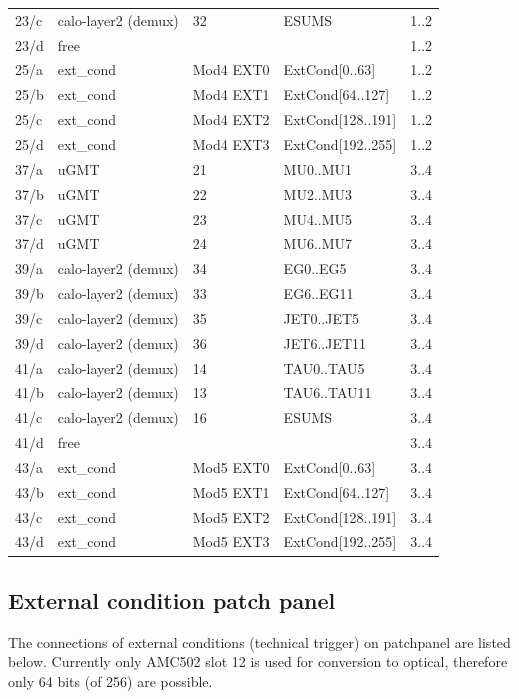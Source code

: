 \begin{longtable}{|l|l|l|l|c|}
23/c & calo-layer2 (demux) & 32 & ESUMS & 1..2\\
23/d & free &  &  & 1..2\\
25/a & ext\_cond & Mod4 EXT0 & ExtCond[0..63] & 1..2 \\
25/b & ext\_cond & Mod4 EXT1 & ExtCond[64..127] & 1..2\\
25/c & ext\_cond & Mod4 EXT2 & ExtCond[128..191] & 1..2\\
25/d & ext\_cond & Mod4 EXT3 & ExtCond[192..255] & 1..2\\\hline
37/a & uGMT & 21 & MU0..MU1 & 3..4\\
37/b & uGMT & 22 & MU2..MU3 & 3..4\\
37/c & uGMT & 23 & MU4..MU5 & 3..4\\
37/d & uGMT & 24 & MU6..MU7 & 3..4\\
39/a & calo-layer2 (demux) & 34 & EG0..EG5 & 3..4\\
39/b & calo-layer2 (demux) & 33 & EG6..EG11 & 3..4\\
39/c & calo-layer2 (demux) & 35 & JET0..JET5 & 3..4\\
39/d & calo-layer2 (demux) & 36 & JET6..JET11 & 3..4\\
41/a & calo-layer2 (demux) & 14 & TAU0..TAU5 & 3..4\\
41/b & calo-layer2 (demux) & 13 & TAU6..TAU11 & 3..4\\
41/c & calo-layer2 (demux) & 16 & ESUMS & 3..4\\
41/d & free &  &  & 3..4\\
43/a & ext\_cond & Mod5 EXT0 & ExtCond[0..63] & 3..4 \\
43/b & ext\_cond & Mod5 EXT1 & ExtCond[64..127] & 3..4\\
43/c & ext\_cond & Mod5 EXT2 & ExtCond[128..191] & 3..4\\
43/d & ext\_cond & Mod5 EXT3 & ExtCond[192..255] & 3..4\\\hline
\end{longtable}

\subsection{External condition patch panel}\label{sec:app:ext_cond_pp}

The connections of external conditions (technical trigger) on patchpanel are listed below. Currently only AMC502 slot 12 is used for conversion to optical, therefore only 64 bits (of 256) are possible.

